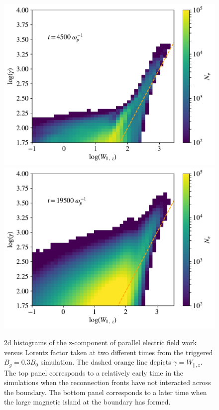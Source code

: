 \documentclass[iop,twocolappendix]{emulateapj}
\begin{document}
\begin{figure}[htp] 
	\includegraphics[width=\linewidth]{bguide3_triggered_final_wparz_gam_t15.pdf}
	\newline
	\includegraphics[width=\linewidth]{bguide3_triggered_final_wparz_gam_t65.pdf}
	
	\caption{2d histograms of the z-component of parallel electric field work versus Lorentz factor taken at two different times from the triggered $B_{g}=0.3B_{0}$ simulation.  The dashed orange line depicts $\gamma = W_{||,z}$.  The top panel corresponds to a relatively early time in the simulations when the reconnection fronts have not interacted across the boundary.  The bottom panel corresponds to a later time when the large magnetic island at the boundary has formed. }
	\label{wpar_hist_earlytime}
\end{figure}
\end{document}
